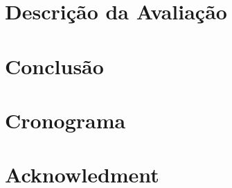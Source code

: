 \documentclass[a4paper, 12pt]{article}
\begin{document}
\section{Descrição da Avaliação}


\section{Conclusão}



\section{Cronograma}


\section{Acknowledment}



% 



\end{document}
